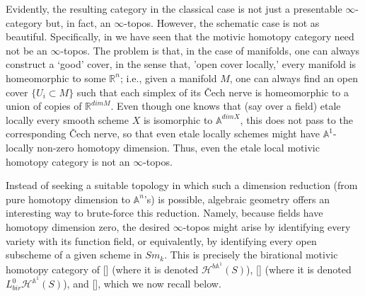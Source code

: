 Evidently, the resulting category in the classical case is not just a presentable $\infty$-category but, in fact, an $\infty$-topos. However, the schematic case is not as beautiful. Specifically, in  we have seen that the motivic homotopy category need not be an $\infty$-topos. The problem is that, in the case of manifolds, one can always construct a `good' cover, in the sense that, 'open cover locally,' every manifold is homeomorphic to some $\mathbb{R}^n$; i.e., given a manifold $M$, one can always find an open cover $\{U_i\subset M\}$ such that each simplex of its \v{C}ech nerve is homeomorphic to a union of copies of $\mathbb{R}^{dimM}$. Even though one knows that (say over a field) etale locally every smooth scheme $X$ is isomorphic to $\mathbb{A}^{dimX}$, this does not pass to the corresponding \v{C}ech nerve, so that even etale locally schemes might have $\mathbb{A}^1$-locally non-zero homotopy dimension. Thus, even the etale local motivic homotopy category is not an $\infty$-topos. 

Instead of seeking a suitable topology in which such a dimension reduction (from pure homotopy dimension to $\mathbb{A}^n$'s) is possible, algebraic geometry offers an interesting way to brute-force this reduction. Namely, because fields have homotopy dimension zero, the desired $\infty$-topos might arise by identifying every variety with its function field, or equivalently, by identifying every open subscheme of a given scheme in $Sm_k$. This is precisely the birational motivic homotopy category of [\cite{0bat}] (where it is denoted $\mathcal{H}^{b\mathbb{A}^1}(S)$), [\cite{bachmann2019voevodsky}] (where it is denoted $L^0_{bir}\mathcal{H}^{\mathbb{A}^1}(S)$), and [\cite{pelaez2014unstable}], which we now recall below.

